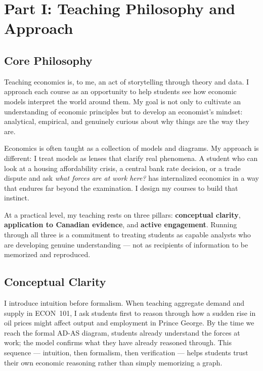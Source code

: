 \documentclass[11pt,letterpaper]{article}
\begin{document}
\vspace{12pt}

\section{Part I: Teaching Philosophy and Approach}

\subsection{Core Philosophy}

Teaching economics is, to me, an act of storytelling through theory and data. I approach each course as an opportunity to help students see how economic models interpret the world around them. My goal is not only to cultivate an understanding of economic principles but to develop an economist's mindset: analytical, empirical, and genuinely curious about why things are the way they are.

Economics is often taught as a collection of models and diagrams. My approach is different: I treat models as lenses that clarify real phenomena. A student who can look at a housing affordability crisis, a central bank rate decision, or a trade dispute and ask \textit{what forces are at work here?} has internalized economics in a way that endures far beyond the examination. I design my courses to build that instinct.

At a practical level, my teaching rests on three pillars: \textbf{conceptual clarity}, \textbf{application to Canadian evidence}, and \textbf{active engagement}. Running through all three is a commitment to treating students as capable analysts who are developing genuine understanding --- not as recipients of information to be memorized and reproduced.

\subsection{Conceptual Clarity}

I introduce intuition before formalism. When teaching aggregate demand and supply in ECON~101, I ask students first to reason through how a sudden rise in oil prices might affect output and employment in Prince George. By the time we reach the formal AD-AS diagram, students already understand the forces at work; the model confirms what they have already reasoned through. This sequence --- intuition, then formalism, then verification --- helps students trust their own economic reasoning rather than simply memorizing a graph.
\end{document}

